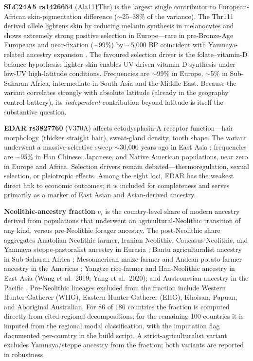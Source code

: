 \documentclass[11pt,letterpaper]{article}
\begin{document}
\textbf{SLC24A5 rs1426654} (Ala111Thr) is the largest single contributor to European-African skin-pigmentation difference ($\sim$25--38\% of the variance). The Thr111 derived allele lightens skin by reducing melanin synthesis in melanocytes and shows extremely strong positive selection in Europe---rare in pre-Bronze-Age Europeans and near-fixation ($\sim$99\%) by $\sim$5{,}000 BP coincident with Yamnaya-related ancestry expansion \citep{mathieson2015}. The favoured selection driver is the folate--vitamin-D balance hypothesis: lighter skin enables UV-driven vitamin D synthesis under low-UV high-latitude conditions. Frequencies are $\sim$99\% in Europe, $\sim$5\% in Sub-Saharan Africa, intermediate in South Asia and the Middle East. Because the variant correlates strongly with absolute latitude (already in the geography control battery), its \emph{independent} contribution beyond latitude is itself the substantive question.

\textbf{EDAR rs3827760} (V370A) affects ectodysplasin-A receptor function---hair morphology (thicker straight hair), sweat-gland density, tooth shape. The variant underwent a massive selective sweep $\sim$30{,}000 years ago in East Asia \citep{sabeti2007}; frequencies are $\sim$95\% in Han Chinese, Japanese, and Native American populations, near zero in Europe and Africa. Selection drivers remain debated---thermoregulation, sexual selection, or pleiotropic effects. Among the eight loci, EDAR has the weakest direct link to economic outcomes; it is included for completeness and serves primarily as a marker of East Asian and Asian-derived ancestry.

\textbf{Neolithic-ancestry fraction} $\nu_i$ is the country-level share of modern ancestry derived from populations that underwent an agricultural-Neolithic transition of any kind, versus pre-Neolithic forager ancestry. The post-Neolithic share aggregates Anatolian Neolithic farmer, Iranian Neolithic, Caucasus-Neolithic, and Yamnaya steppe-pastoralist ancestry in Eurasia \citep{lazaridis2014}; Bantu agriculturalist ancestry in Sub-Saharan Africa \citep{patin2017,lipson2020}; Mesoamerican maize-farmer and Andean potato-farmer ancestry in the Americas \citep{reich2012,posth2018}; Yangtze rice-farmer and Han-Neolithic ancestry in East Asia (Wang et al.\ 2019; Yang et al.\ 2020); and Austronesian ancestry in the Pacific \citep{skoglund2016,bergstrom2017}. Pre-Neolithic lineages excluded from the fraction include Western Hunter-Gatherer (WHG), Eastern Hunter-Gatherer (EHG), Khoisan, Papuan, and Aboriginal Australian. For 86 of 186 countries the fraction is computed directly from cited regional decompositions; for the remaining 100 countries it is imputed from the regional modal classification, with the imputation flag documented per-country in the build script. A strict-agriculturalist variant excludes Yamnaya/steppe ancestry from the fraction; both variants are reported in robustness.
\end{document}
